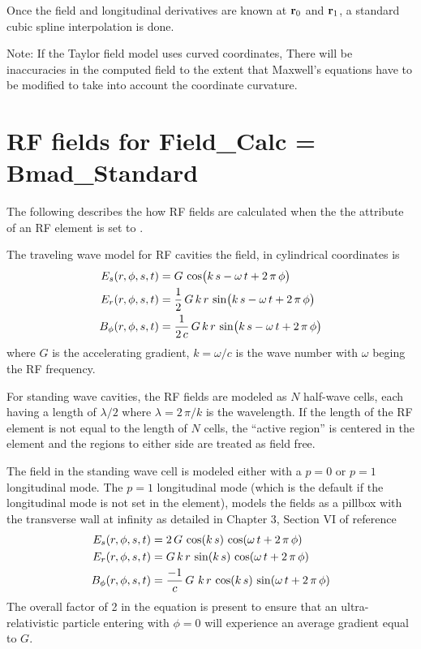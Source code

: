 Once the field and longitudinal derivatives are known at ${\bf r}_0$ and ${\bf r}_1$, a
standard cubic spline interpolation is done.

Note: If the Taylor field model uses curved coordinates, There will be inaccuracies in the
computed field to the extent that Maxwell's equations have to be modified to take into
account the coordinate curvature.

\section{RF fields for Field_Calc = Bmad_Standard}
\label{s:rf.fields}

The following describes the how RF fields are calculated when the the 
attribute of an RF element is set to .

The traveling wave model for RF cavities the field, in cylindrical coordinates is
\begin{align}
  E_s(r, \phi, s, t) &= G \, \cos\bigl( k \, s - \omega \, t + 2 \, \pi \, \phi \bigr) \nonumber \\
  E_r(r, \phi, s, t) &= \frac{1}{2} \, G \, k \, r \, \sin\bigl( k \, s - \omega \, t + 2 \, \pi \, \phi \bigr) \\
  B_\phi(r, \phi, s, t) &= \frac{1}{2 \, c} \, G \, k \, r \, \sin\bigl( k \, s - \omega \, t + 2 \, \pi \, \phi \bigr) \nonumber
  \label{egot}
\end{align}
where $G$ is the accelerating gradient, $k = \omega / c$ is the wave number with $\omega$ beging the
RF frequency.

For standing wave cavities, the RF fields are modeled as $N$ half-wave cells, each having a length
of $\lambda/2$ where $\lambda = 2 \, \pi / k$ is the wavelength. If the length of the RF element is
not equal to the length of $N$ cells, the ``active region'' is centered in the element and the
regions to either side are treated as field free.

The field in the standing wave cell is modeled either with a $p = 0$ or $p = 1$ longitudinal
mode. The $p = 1$ longitudinal mode (which is the default if the longitudinal mode is not set in the
element), models the fields as a pillbox with the transverse wall at infinity as detailed in Chapter
3, Section VI of reference \cite{b:lee}
\begin{align}
  E_s(r, \phi, s, t)    &= 2 \, G \,                         \cos(k \, s) \, \cos(\omega \, t + 2 \, \pi \, \phi) \nonumber \\
  E_r(r, \phi, s, t)    &= G \, k \, r \,                    \sin(k \, s) \, \cos(\omega \, t + 2 \, \pi \, \phi) \\
  B_\phi(r, \phi, s, t) &= \frac{-1}{c} \, G \, \, k \, r \, \cos(k \, s) \, \sin(\omega \, t + 2 \, \pi \, \phi) \nonumber
  \label{egot2}
\end{align}
The overall factor of 2 in the equation is present to ensure that an ultra-relativistic particle
entering with $\phi = 0$ will experience an average gradient equal to $G$.

